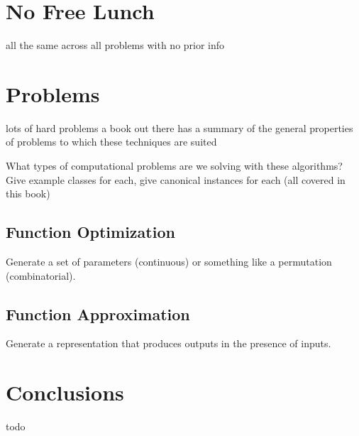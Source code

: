 \documentclass[a4paper, 11pt]{article}
\begin{document}
% 
% 
\section{No Free Lunch}
\label{sec:nfl}
all the same across all problems with no prior info


% 
% 
\section{Problems}
\label{sec:problems}
lots of hard problems
a book out there has a summary of the general properties of problems to which these techniques are suited

What types of computational problems are we solving with these algorithms?
Give example classes for each, give canonical instances for each (all covered in this book)

\subsection{Function Optimization}
Generate a set of parameters (continuous) or something like a permutation (combinatorial).

\subsection{Function Approximation}
Generate a representation that produces outputs in the presence of inputs.

% 
% 
\section{Conclusions}
\label{sec:conclusions}
todo



\end{document}
